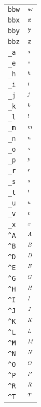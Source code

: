 \begin{longtable}{ll}
\texttt{bbw}&${}\mathbb{w}{}$\\
\texttt{bbx}&${}\mathbb{x}{}$\\
\texttt{bby}&${}\mathbb{y}{}$\\
\texttt{bbz}&${}\mathbb{z}{}$\\
\texttt{\_a}&${}_a{}$\\
\texttt{\_e}&${}_e{}$\\
\texttt{\_h}&${}_h{}$\\
\texttt{\_i}&${}_i{}$\\
\texttt{\_j}&${}_j{}$\\
\texttt{\_k}&${}_k{}$\\
\texttt{\_l}&${}_l{}$\\
\texttt{\_m}&${}_m{}$\\
\texttt{\_n}&${}_n{}$\\
\texttt{\_o}&${}_o{}$\\
\texttt{\_p}&${}_p{}$\\
\texttt{\_r}&${}_r{}$\\
\texttt{\_s}&${}_s{}$\\
\texttt{\_t}&${}_t{}$\\
\texttt{\_u}&${}_u{}$\\
\texttt{\_v}&${}_v{}$\\
\texttt{\_x}&${}_x{}$\\
\texttt{\textasciicircum A}&${}^A{}$\\
\texttt{\textasciicircum B}&${}^B{}$\\
\texttt{\textasciicircum D}&${}^D{}$\\
\texttt{\textasciicircum E}&${}^E{}$\\
\texttt{\textasciicircum G}&${}^G{}$\\
\texttt{\textasciicircum H}&${}^H{}$\\
\texttt{\textasciicircum I}&${}^I{}$\\
\texttt{\textasciicircum J}&${}^J{}$\\
\texttt{\textasciicircum K}&${}^K{}$\\
\texttt{\textasciicircum L}&${}^L{}$\\
\texttt{\textasciicircum M}&${}^M{}$\\
\texttt{\textasciicircum N}&${}^N{}$\\
\texttt{\textasciicircum O}&${}^O{}$\\
\texttt{\textasciicircum P}&${}^P{}$\\
\texttt{\textasciicircum R}&${}^R{}$\\
\texttt{\textasciicircum T}&${}^T{}$\\

\end{longtable}
